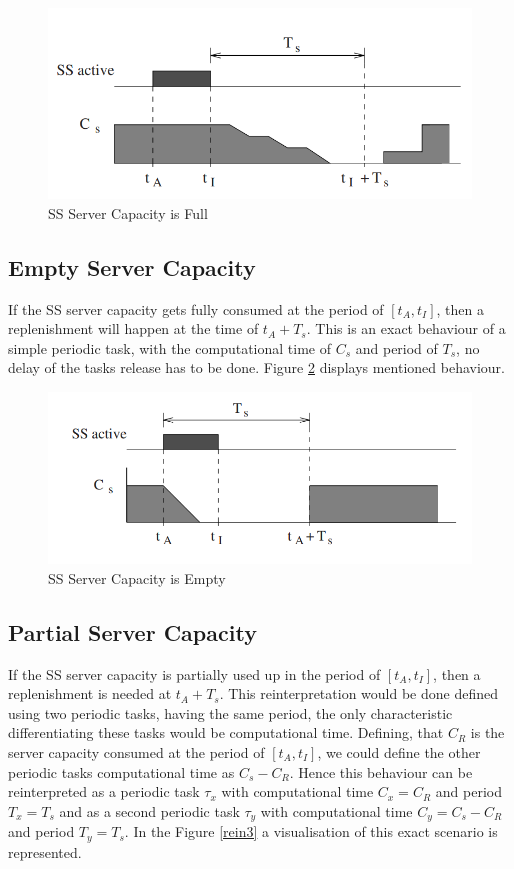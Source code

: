 \documentclass[conference]{IEEEtran}
\begin{document}
\begin{figure}[htbp]
\centerline{\includegraphics[scale=.39]{reinterpretation_full_capacity.png}}
\caption{SS Server Capacity is Full \cite{b1}}
\label{rein1}
\end{figure}

\subsection{Empty Server Capacity}

If the SS server capacity gets fully consumed at the period of  $[t_A,t_I ]$, then a replenishment will happen at the time of $t_A + T_s$. This is an exact behaviour of a simple periodic task, with the computational time of $C_s$ and period of $T_s$, no delay of the tasks release has to be done. Figure \ref{rein2} displays mentioned behaviour.

\begin{figure}[htbp]
\centerline{\includegraphics[scale=.39]{reinterpretation_no_capacity.png}}
\caption{SS Server Capacity is Empty \cite{b1}}
\label{rein2}
\end{figure}

\subsection{Partial Server Capacity}

If the SS server capacity is partially used up in the period of  $[t_A,t_I ]$, then a replenishment is needed at $t_A + T_s$. This  reinterpretation would be done defined using two periodic tasks, having the same period, the only characteristic differentiating these tasks would be computational time. Defining, that $C_R$ is the server capacity consumed at the period of $[t_A,t_I ]$, we could define the other periodic tasks computational time as $C_s - C_R$. Hence this behaviour can be reinterpreted as a periodic task $\tau_x$ with computational time $C_x = C_R$ and period $T_x = T_s$ and as a second periodic task $\tau_y$ with computational time $C_y = C_s - C_R$ and period $T_y = T_s$. In the Figure \ref{rein3} a visualisation of this exact scenario is represented.
\end{document}
